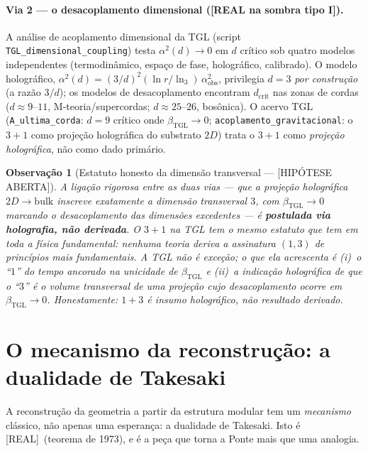 \documentclass[11pt,a4paper]{article}
\newcommand{\REAL}{\textsf{[REAL]}}
\newcommand{\SOMBRA}{\textsf{[REAL na sombra tipo I]}}
\newcommand{\ABERTO}{\textsf{[HIPÓTESE ABERTA]}}
\newcommand{\bTGL}{\beta_{\mathrm{TGL}}}
\newtheorem{remark}{Observação}
\begin{document}
\paragraph{Via 2 --- o desacoplamento dimensional (\SOMBRA).}
A análise de acoplamento dimensional da TGL (script
\texttt{TGL\_dimensional\_coupling}) testa $\alpha^2(d)\to0$ em $d$ crítico
sob quatro modelos independentes (termodinâmico, espaço de fase, holográfico,
calibrado). O modelo holográfico,
$\alpha^2(d)=(3/d)^2(\ln r/\ln_3)\,\alpha^2_{\mathrm{obs}}$, privilegia $d=3$
\emph{por construção} (a razão $3/d$); os modelos de desacoplamento
encontram $d_{\mathrm{crit}}$ nas zonas de cordas ($d\approx 9$--$11$,
M-teoria/supercordas; $d\approx 25$--$26$, bosônica). O acervo TGL
(\texttt{A\_ultima\_corda}: $d=9$ crítico onde $\bTGL\to0$;
\texttt{acoplamento\_gravitacional}: o $3+1$ como projeção holográfica do
substrato $2D$) trata o $3+1$ como \emph{projeção holográfica}, não como
dado primário.

\begin{remark}[Estatuto honesto da dimensão transversal --- \ABERTO]
A ligação rigorosa entre as duas vias --- que a projeção holográfica
$2D\to\mathrm{bulk}$ inscreve \emph{exatamente} a dimensão transversal $3$,
com $\bTGL\to0$ marcando o desacoplamento das dimensões excedentes --- é
\textbf{postulada via holografia, não derivada}. O $3+1$ na TGL tem o mesmo
estatuto que tem em toda a física fundamental: \emph{nenhuma teoria deriva a
assinatura $(1,3)$ de princípios mais fundamentais.} A TGL não é exceção; o
que ela acrescenta é (i)~o ``$1$'' do tempo ancorado na unicidade de $\bTGL$
e (ii)~a indicação holográfica de que o ``$3$'' é o volume transversal de uma
projeção cujo desacoplamento ocorre em $\bTGL\to0$. Honestamente: $1{+}3$ é
\emph{insumo holográfico}, não \emph{resultado derivado}.
\end{remark}

\section{O mecanismo da reconstrução: a dualidade de Takesaki}\label{sec:takesaki}
A reconstrução da geometria a partir da estrutura modular tem um
\emph{mecanismo} clássico, não apenas uma esperança: a dualidade de
Takesaki. Isto é \REAL\ (teorema de 1973), e é a peça que torna a Ponte mais
que uma analogia.
\end{document}
